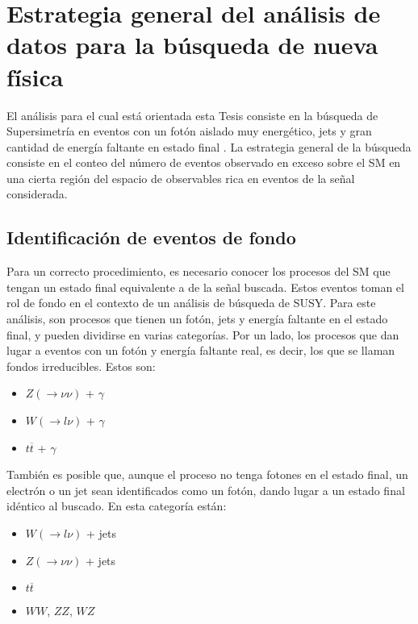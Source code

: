 \chapter{Estrategia general del análisis de datos para la búsqueda de nueva física}



El análisis para el cual está orientada esta Tesis consiste en la búsqueda de Supersimetría en eventos con un fotón aislado muy energético, jets y gran cantidad de energía faltante en estado final \cite{Alonso:2147473}\cite{ATLAS:2016fks}\cite{Collaboration:2198651}. La estrategia general de la búsqueda consiste en el conteo del número de eventos observado en exceso sobre el SM en una cierta región del espacio de observables rica en eventos de la señal considerada.


\section{Identificación de eventos de fondo}

Para un correcto procedimiento, es necesario conocer los procesos del SM que tengan un estado final equivalente a de la señal buscada. Estos eventos toman el rol de fondo en el contexto de un análisis de búsqueda de SUSY. Para este análisis, son procesos que tienen un fotón, jets y energía faltante en el estado final, y pueden dividirse en varias categorías. Por un lado, los procesos que dan lugar a eventos con un fotón y energía faltante real, es decir, los que se llaman fondos irreducibles. Estos son:

\begin{itemize}

	\item $Z(\rightarrow \nu\nu)$ + $\gamma$

	\item $W (\rightarrow l\nu)$ + $\gamma$

	\item $t \overline{t}$ + $\gamma$

\end{itemize}

También es posible que, aunque el proceso no tenga fotones en el estado final, un electrón o un jet sean identificados como un fotón, dando lugar a un estado final idéntico al buscado. En esta categoría están:

\begin{itemize}

	\item $W (\rightarrow l\nu)$ + jets

	\item $Z (\rightarrow \nu\nu)$ + jets

	\item $t \overline{t}$

	\item $WW$, $ZZ$, $WZ$

\end{itemize}

